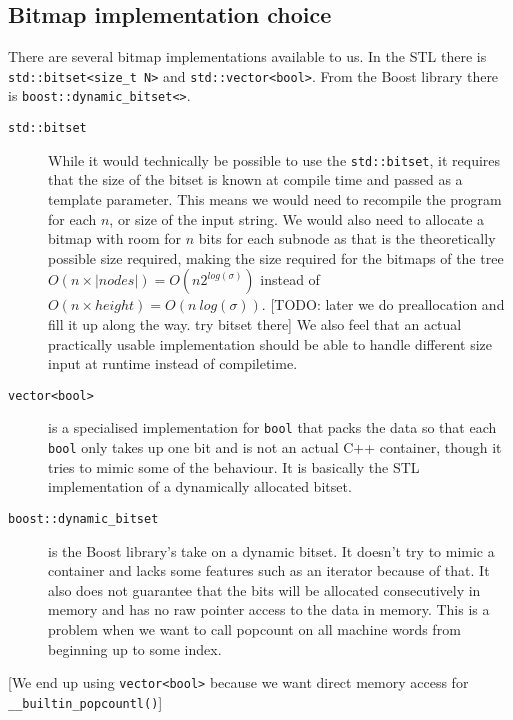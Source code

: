 \subsection{Bitmap implementation choice}
There are several bitmap implementations available to us. In the STL there is \texttt{std::bitset<size\_t N>} and \texttt{std::vector<bool>}. From the Boost library there is \texttt{boost::dynamic\_bitset<>}.
\begin{description}
\item[\texttt{std::bitset}] While it would technically be possible to use the \texttt{std::bitset}, it requires that the size of the bitset is known at compile time and passed as a template parameter. This means we would need to recompile the program for each $n$, or size of the input string. We would also need to allocate a bitmap with room for $n$ bits for each subnode as that is the theoretically possible size required, making the size required for the bitmaps of the tree $O(n \times |nodes|) = O(n2^{log(\sigma)})$ instead of $O(n \times height) = O(n~log(\sigma))$.
[TODO: later we do preallocation and fill it up along the way. try bitset there]
We also feel that an actual practically usable implementation should be able to handle different size input at runtime instead of compiletime. 

\item[\texttt{vector<bool>}] is a specialised implementation for \texttt{bool} that packs the data so that each \texttt{bool} only takes up one bit and is not an actual C++ container, though it tries to mimic some of the behaviour. It is basically the STL implementation of a dynamically allocated bitset.

\item[\texttt{boost::dynamic\_bitset}] is the Boost library's take on a dynamic bitset. It doesn't try to mimic a container and lacks some features such as an iterator because of that. It also does not guarantee that the bits will be allocated consecutively in memory and has no raw pointer access to the data in memory. This is a problem when we want to call popcount on all machine words from beginning up to some index.
\end{description}

[We end up using \texttt{vector<bool>} because we want direct memory access for \verb#__builtin_popcountl()#]

